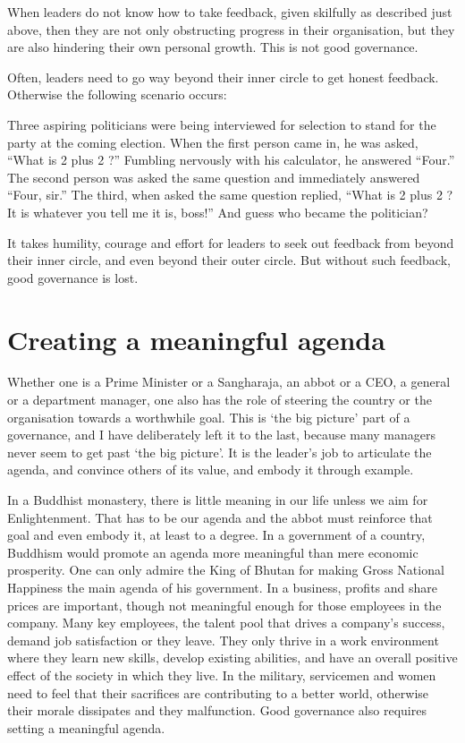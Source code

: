 \documentclass[11pt, openany]{book}
\begin{document}
When leaders do not know how to take feedback, given skilfully as described just above, then they are not only obstructing progress in their organisation, but they are also hindering their own personal growth. This is not good governance.

Often, leaders need to go way beyond their inner circle to get honest feedback. Otherwise the following scenario occurs:

Three aspiring politicians were being interviewed for selection to stand for the party at the coming election. When the first person came in, he was asked, “What is 2 plus 2 ?” Fumbling nervously with his calculator, he answered “Four.” The second person was asked the same question and immediately answered “Four, sir.” The third, when asked the same question replied, “What is 2 plus 2 ? It is whatever you tell me it is, boss!” And guess who became the politician?

It takes humility, courage and effort for leaders to seek out feedback from beyond their inner circle, and even beyond their outer circle. But without such feedback, good governance is lost.

\section{Creating a meaningful agenda}

Whether one is a Prime Minister or a Sangharaja, an abbot or a CEO, a general or a department manager, one also has the role of steering the country or the organisation towards a worthwhile goal. This is ‘the big picture’ part of a governance, and I have deliberately left it to the last, because many managers never seem to get past ‘the big picture’. It is the leader’s job to articulate the agenda, and convince others of its value, and embody it through example.

In a Buddhist monastery, there is little meaning in our life unless we aim for Enlightenment. That has to be our agenda and the abbot must reinforce that goal and even embody it, at least to a degree. In a government of a country, Buddhism would promote an agenda more meaningful than mere economic prosperity. One can only admire the King of Bhutan for making Gross National Happiness the main agenda of his government. In a business, profits and share prices are important, though not meaningful enough for those employees in the company. Many key employees, the talent pool that drives a company’s success, demand job satisfaction or they leave. They only thrive in a work environment where they learn new skills, develop existing abilities, and have an overall positive effect of the society in which they live. In the military, servicemen and women need to feel that their sacrifices are contributing to a better world, otherwise their morale dissipates and they malfunction. Good governance also requires setting a meaningful agenda.
\end{document}
